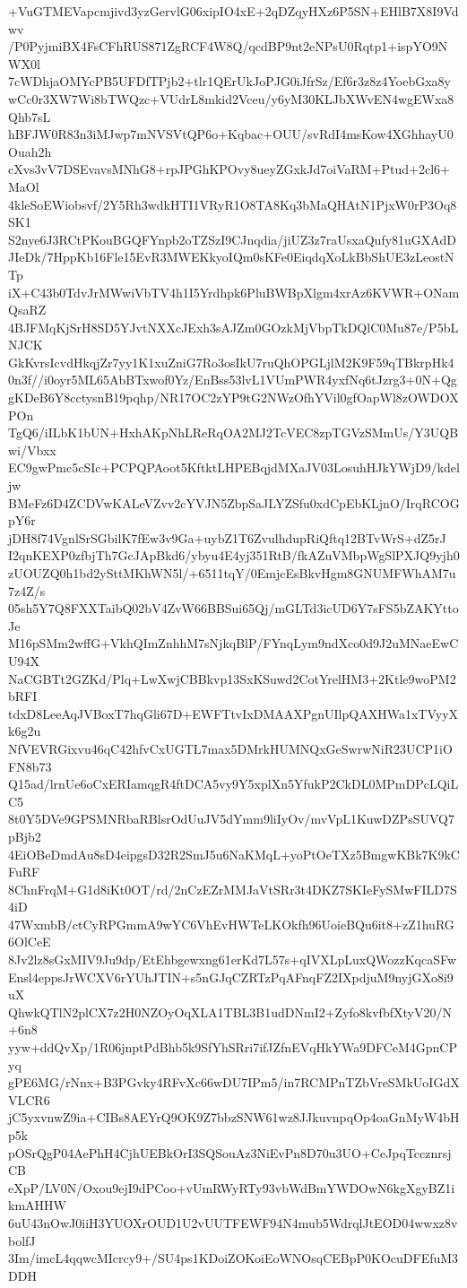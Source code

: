 +VuGTMEVapcmjivd3yzGervlG06xipIO4xE+2qDZqyHXz6P5SN+EHlB7X8I9Vdwv
/P0PyjmiBX4FsCFhRUS871ZgRCF4W8Q/qcdBP9nt2eNPsU0Rqtp1+ispYO9NWX0l
7cWDhjaOMYcPB5UFDfTPjb2+tlr1QErUkJoPJG0iJfrSz/Ef6r3z8z4YoebGxa8y
wCc0r3XW7Wi8bTWQzc+VUdrL8mkid2Vceu/y6yM30KLJbXWvEN4wgEWxa8Qhb7sL
hBFJW0R83n3iMJwp7mNVSVtQP6o+Kqbac+OUU/svRdI4msKow4XGhhayU0Ouah2h
cXvs3vV7DSEvavsMNhG8+rpJPGhKPOvy8ueyZGxkJd7oiVaRM+Ptud+2cl6+MaOl
4kleSoEWiobsvf/2Y5Rh3wdkHTI1VRyR1O8TA8Kq3bMaQHAtN1PjxW0rP3Oq8SK1
S2nye6J3RCtPKouBGQFYnpb2oTZSzI9CJnqdia/jiUZ3z7raUsxaQufy81uGXAdD
JIeDk/7HppKb16Fle15EvR3MWEKkyoIQm0sKFe0EiqdqXoLkBbShUE3zLeostNTp
iX+C43b0TdvJrMWwiVbTV4h1I5Yrdhpk6PluBWBpXlgm4xrAz6KVWR+ONamQsaRZ
4BJFMqKjSrH8SD5YJvtNXXcJExh3sAJZm0GOzkMjVbpTkDQlC0Mu87e/P5bLNJCK
GkKvrsIcvdHkqjZr7yy1K1xuZniG7Ro3osIkU7ruQhOPGLjlM2K9F59qTBkrpHk4
0n3f//i0oyr5ML65AbBTxwof0Yz/EnBss53lvL1VUmPWR4yxfNq6tJzrg3+0N+Qg
gKDeB6Y8cctysnB19pqhp/NR17OC2zYP9tG2NWzOfhYVil0gfOapWl8zOWDOXPOn
TgQ6/iILbK1bUN+HxhAKpNhLReRqOA2MJ2TcVEC8zpTGVzSMmUs/Y3UQBwi/Vbxx
EC9gwPmc5cSIc+PCPQPAoot5KftktLHPEBqjdMXaJV03LosuhHJkYWjD9/kdeljw
BMeFz6D4ZCDVwKALeVZvv2cYVJN5ZbpSaJLYZSfu0xdCpEbKLjnO/IrqRCOGpY6r
jDH8f74VgnlSrSGbilK7fEw3v9Ga+uybZ1T6ZvulhdupRiQftq12BTvWrS+dZ5rJ
I2qnKEXP0zfbjTh7GcJApBkd6/ybyu4E4yj351RtB/fkAZuVMbpWgSlPXJQ9yjh0
zUOUZQ0h1bd2ySttMKhWN5l/+6511tqY/0EmjcEsBkvHgm8GNUMFWhAM7u7z4Z/s
05sh5Y7Q8FXXTaibQ02bV4ZvW66BBSui65Qj/mGLTd3icUD6Y7sFS5bZAKYttoJe
M16pSMm2wffG+VkhQImZnhhM7sNjkqBlP/FYnqLym9ndXco0d9J2uMNaeEwCU94X
NaCGBTt2GZKd/Plq+LwXwjCBBkvp13SxKSuwd2CotYrelHM3+2Ktle9woPM2bRFI
tdxD8LeeAqJVBoxT7hqGli67D+EWFTtvIxDMAAXPgnUIlpQAXHWa1xTVyyXk6g2u
NfVEVRGixvu46qC42hfvCxUGTL7max5DMrkHUMNQxGeSwrwNiR23UCP1iOFN8b73
Q15ad/lrnUe6oCxERIamqgR4ftDCA5vy9Y5xplXn5YfukP2CkDL0MPmDPcLQiLC5
8t0Y5DVe9GPSMNRbaRBlsrOdUuJV5dYmm9liIyOv/mvVpL1KuwDZPsSUVQ7pBjb2
4EiOBeDmdAu8sD4eipgsD32R2SmJ5u6NaKMqL+yoPtOeTXz5BmgwKBk7K9kCFuRF
8ChnFrqM+G1d8iKt0OT/rd/2nCzEZrMMJaVtSRr3t4DKZ7SKIeFySMwFILD7S4iD
47WxmbB/ctCyRPGmmA9wYC6VhEvHWTeLKOkfh96UoieBQu6it8+zZ1huRG6OlCeE
8Jv2lz8sGxMIV9Ju9dp/EtEhbgewxng61erKd7L57s+qIVXLpLuxQWozzKqcaSFw
Ensl4eppsJrWCXV6rYUhJTIN+s5nGJqCZRTzPqAFnqFZ2IXpdjuM9nyjGXo8i9uX
QhwkQTlN2plCX7z2H0NZOyOqXLA1TBL3B1udDNmI2+Zyfo8kvfbfXtyV20/N+6n8
yyw+ddQvXp/1R06jnptPdBhb5k9SfYhSRri7ifJZfnEVqHkYWa9DFCeM4GpnCPyq
gPE6MG/rNnx+B3PGvky4RFvXc66wDU7IPm5/in7RCMPnTZbVreSMkUoIGdXVLCR6
jC5yxvnwZ9ia+CIBs8AEYrQ9OK9Z7bbzSNW61wz8JJkuvnpqOp4oaGnMyW4bHp5k
pOSrQgP04AePhH4CjhUEBkOrI3SQSouAz3NiEvPn8D70u3UO+CeJpqTccznrsjCB
eXpP/LV0N/Oxou9ejI9dPCoo+vUmRWyRTy93vbWdBmYWDOwN6kgXgyBZ1ikmAHHW
6uU43nOwJ0iiH3YUOXrOUD1U2vUUTFEWF94N4mub5WdrqlJtEOD04wwxz8vbolfJ
3Im/imcL4qqwcMIcrcy9+/SU4ps1KDoiZOKoiEoWNOsqCEBpP0KOcuDFEfuM3DDH

